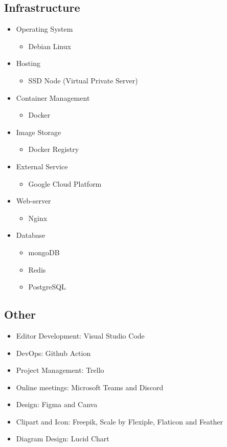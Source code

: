 \subsection{Infrastructure}
\begin{itemize}
	\item Operating System
	\begin{itemize}
		\item Debian Linux
	\end{itemize}
	\item Hosting
	\begin{itemize}
		\item SSD Node (Virtual Private Server)
	\end{itemize}
	\item Container Management
	\begin{itemize}
		\item Docker
	\end{itemize}
	\item Image Storage
	\begin{itemize}
		\item Docker Registry
	\end{itemize}
	\item External Service
	\begin{itemize}
		\item Google Cloud Platform
	\end{itemize}
	\item Web-server
	\begin{itemize}
		\item Nginx
	\end{itemize}
	\item Database
	\begin{itemize}
		\item mongoDB
		\item Redis
		\item PostgreSQL
	\end{itemize}
\end{itemize}
\subsection{Other}
\begin{itemize}
	\item Editor Development: Visual Studio Code
	\item DevOps: Github Action
	\item Project Management: Trello
	\item Online meetings: Microsoft Teams and Discord
	\item Design: Figma and Canva
	\item Clipart and Icon: Freepik, Scale by Flexiple, Flaticon and Feather
	\item Diagram Design: Lucid Chart
\end{itemize}

